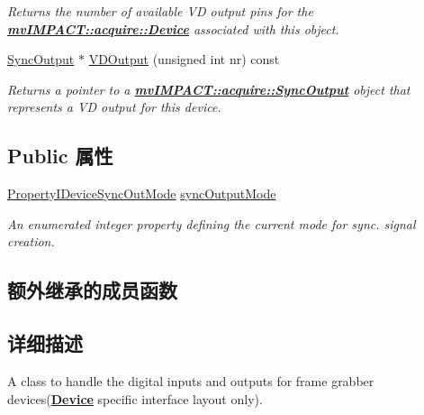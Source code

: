 \begin{DoxyCompactItemize}
\begin{DoxyCompactList}\small\item\em Returns the number of available V\+D output pins for the {\bfseries \hyperlink{classmv_i_m_p_a_c_t_1_1acquire_1_1_device}{mv\+I\+M\+P\+A\+C\+T\+::acquire\+::\+Device}} associated with this object. \end{DoxyCompactList}\item 
\hyperlink{classmv_i_m_p_a_c_t_1_1acquire_1_1_sync_output}{Sync\+Output} $\ast$ \hyperlink{classmv_i_m_p_a_c_t_1_1acquire_1_1_i_o_sub_system_frame_grabber_aa68fc4dacd234e7a0ae41210b26baf4d}{V\+D\+Output} (unsigned int nr) const 
\begin{DoxyCompactList}\small\item\em Returns a pointer to a {\bfseries \hyperlink{classmv_i_m_p_a_c_t_1_1acquire_1_1_sync_output}{mv\+I\+M\+P\+A\+C\+T\+::acquire\+::\+Sync\+Output}} object that represents a V\+D output for this device. \end{DoxyCompactList}\end{DoxyCompactItemize}
\subsection*{Public 属性}
\begin{DoxyCompactItemize}
\item 
\hyperlink{group___device_specific_interface_ga482ce750b5e60bc66a44cd2640ae757e}{Property\+I\+Device\+Sync\+Out\+Mode} \hyperlink{classmv_i_m_p_a_c_t_1_1acquire_1_1_i_o_sub_system_frame_grabber_a0e54ebc0c4382de40b6367bd7ac30288}{sync\+Output\+Mode}
\begin{DoxyCompactList}\small\item\em An enumerated integer property defining the current mode for sync. signal creation. \end{DoxyCompactList}\end{DoxyCompactItemize}
\subsection*{额外继承的成员函数}


\subsection{详细描述}
A class to handle the digital inputs and outputs for frame grabber devices({\bfseries \hyperlink{classmv_i_m_p_a_c_t_1_1acquire_1_1_device}{Device}} specific interface layout only). 

